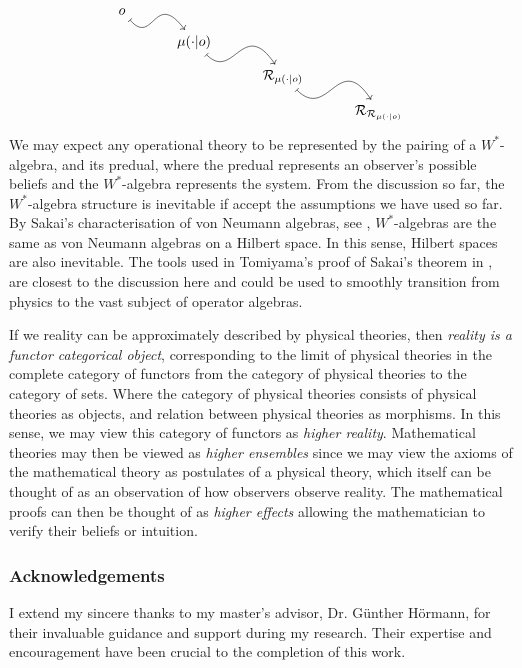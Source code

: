 \documentclass[11pt]{article}
\begin{document}
\[
\begin{tikzcd}[row sep=.75em, column sep=1cm]
	o \\
	& {\mu(\cdot|o)} \\
	&& {\Rcal_{\mu(\cdot|o)}} \\
	&&& {\Rcal_{\Rcal_{\mu(\cdot|o)}}}
	\arrow[mapsto, from=1-1, to=2-2,controls={+(.8,-.9) and +(-1,1.35)},]
	\arrow[mapsto, from=2-2, to=3-3,controls={+(1,-1) and +(-1,1.5)},]
	\arrow[mapsto, from=3-3, to=4-4,controls={+(1.15,-1.15) and +(-1,1.55)},]
\end{tikzcd}
\]
We may expect any operational theory to be represented by the pairing of a $W^*$-algebra, and its predual, where the predual represents an observer's possible beliefs and the $W^*$-algebra represents the system. From the discussion so far, the $W^*$-algebra structure is inevitable if accept the assumptions we have used so far. By Sakai's characterisation of von Neumann algebras, see \cite{Sakai}, $W^*$-algebras are the same as von Neumann algebras on a Hilbert space. In this sense, Hilbert spaces are also inevitable. The tools used in Tomiyama's proof of Sakai's theorem in \cite{TomiyamaII}, are closest to the discussion here and could be used to smoothly transition from physics to the vast subject of operator algebras.

\noindent If we reality can be approximately described by physical theories, then \emph{reality is a functor categorical object}, corresponding to the limit of physical theories in the complete category of functors from the category of physical theories to the category of sets. Where the category of physical theories consists of physical theories as objects, and relation between physical theories as morphisms. In this sense, we may view this category of functors as \emph{higher reality}. Mathematical theories may then be viewed as \emph{higher ensembles} since we may view the axioms of the mathematical theory as postulates of a physical theory, which itself can be thought of as an observation of how observers observe reality. The mathematical proofs can then be thought of as \emph{higher effects} allowing the mathematician to verify their beliefs or intuition.

\subsubsection*{Acknowledgements}
I extend my sincere thanks to my master's advisor, Dr. G\"unther H\"ormann, for their invaluable guidance and support during my research. Their expertise and encouragement have been crucial to the completion of this work.
\end{document}
